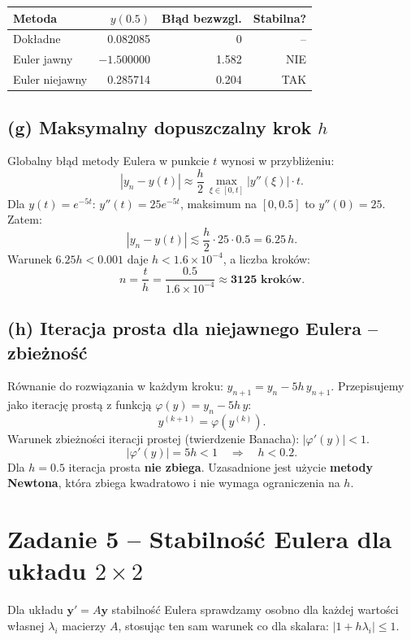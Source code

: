 \documentclass[a4paper,12pt]{article}
\begin{document}
\begin{center}
\begin{tabular}{lrrr}
\toprule
Metoda & $y(0.5)$ & Błąd bezwzgl. & Stabilna? \\
\midrule
Dokładne & 0.082085 & 0 & -- \\
Euler jawny & $-1.500000$ & 1.582 & NIE \\
Euler niejawny & 0.285714 & 0.204 & TAK \\
\bottomrule
\end{tabular}
\end{center}

\subsection*{(g) Maksymalny dopuszczalny krok $h$}

Globalny błąd metody Eulera w punkcie $t$ wynosi w przybliżeniu:
\[
|y_n - y(t)| \approx \frac{h}{2}\,\max_{\xi\in[0,t]}|y''(\xi)|\cdot t.
\]
Dla $y(t)=e^{-5t}$: $y''(t) = 25e^{-5t}$, maksimum na $[0,0.5]$ to $y''(0)=25$. Zatem:
\[
|y_n - y(t)| \lesssim \frac{h}{2}\cdot 25 \cdot 0.5 = 6.25\,h.
\]
Warunek $6.25h < 0.001$ daje $h < 1.6\times 10^{-4}$, a liczba kroków:
\[
n = \frac{t}{h} = \frac{0.5}{1.6\times 10^{-4}} \approx \mathbf{3125 \text{ kroków}}.
\]

\subsection*{(h) Iteracja prosta dla niejawnego Eulera -- zbieżność}

Równanie do rozwiązania w każdym kroku: $y_{n+1} = y_n - 5h\,y_{n+1}$.
Przepisujemy jako iterację prostą z funkcją $\varphi(y) = y_n - 5h\,y$:
\[
y^{(k+1)} = \varphi(y^{(k)}).
\]
Warunek zbieżności iteracji prostej (twierdzenie Banacha): $|\varphi'(y)| < 1$.
\[
|\varphi'(y)| = 5h < 1 \quad\Rightarrow\quad h < 0.2.
\]
Dla $h=0.5$ iteracja prosta \textbf{nie zbiega}. Uzasadnione jest użycie \textbf{metody Newtona},
która zbiega kwadratowo i nie wymaga ograniczenia na $h$.

\section*{Zadanie 5 -- Stabilność Eulera dla układu $2\times 2$}

\begin{komentarz}
Dla układu $\mathbf{y}' = A\mathbf{y}$ stabilność Eulera sprawdzamy osobno dla
każdej wartości własnej $\lambda_i$ macierzy $A$, stosując ten sam warunek
co dla skalara: $|1 + h\lambda_i| \leq 1$.
\end{komentarz}
\end{document}
